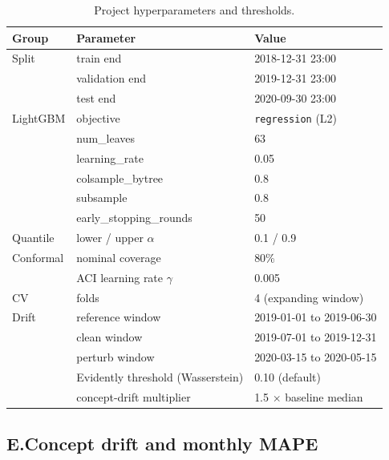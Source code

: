 \documentclass[11pt,a4paper]{article}
\newcommand{\code}[1]{\texttt{\small #1}}
\begin{document}
\begin{table}[H]
\centering
\small
\begin{tabularx}{\linewidth}{@{}l l l@{}}
\toprule
\textbf{Group} & \textbf{Parameter} & \textbf{Value} \\
\midrule
Split     & train end                          & 2018-12-31 23:00 \\
          & validation end                     & 2019-12-31 23:00 \\
          & test end                           & 2020-09-30 23:00 \\
LightGBM  & objective                          & \code{regression} (L2) \\
          & num\_leaves                        & 63 \\
          & learning\_rate                     & 0.05 \\
          & colsample\_bytree                  & 0.8 \\
          & subsample                          & 0.8 \\
          & early\_stopping\_rounds            & 50 \\
Quantile  & lower / upper $\alpha$             & 0.1 / 0.9 \\
Conformal & nominal coverage                   & 80\% \\
          & ACI learning rate $\gamma$         & 0.005 \\
CV        & folds                              & 4 (expanding window) \\
Drift     & reference window                   & 2019-01-01 to 2019-06-30 \\
          & clean window                       & 2019-07-01 to 2019-12-31 \\
          & perturb window                     & 2020-03-15 to 2020-05-15 \\
          & Evidently threshold (Wasserstein)  & 0.10 (default) \\
          & concept-drift multiplier           & 1.5 $\times$ baseline median \\
\bottomrule
\end{tabularx}
\caption{Project hyperparameters and thresholds.}
\label{tab:params}
\end{table}

\subsection*{E.\quad Concept drift and monthly MAPE}
\label{app:monthly}
\end{document}
